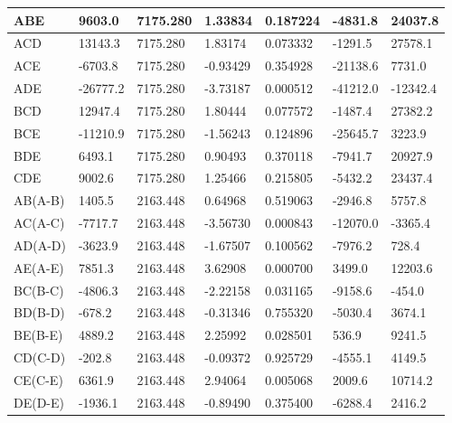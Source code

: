 \documentclass[materials,article,submit,pdftex,moreauthors]{Definitions/mdpi}
\begin{document}
\begin{ThreePartTable}
\begin{footnotesize}
\begin{longtable}{|l|l|l|l|l|l|l|}
        ABE & 9603.0 & 7175.280 & 1.33834 & 0.187224 & -4831.8 & 24037.8 \\ \hline
        ACD & 13143.3 & 7175.280 & 1.83174 & 0.073332 & -1291.5 & 27578.1 \\ \hline
        ACE & -6703.8 & 7175.280 & -0.93429 & 0.354928 & -21138.6 & 7731.0 \\ \hline
        \rowcolor{LightCyan}
        ADE & -26777.2 & 7175.280 & -3.73187 & 0.000512 & -41212.0 & -12342.4 \\ \hline
        BCD & 12947.4 & 7175.280 & 1.80444 & 0.077572 & -1487.4 & 27382.2 \\ \hline
        BCE & -11210.9 & 7175.280 & -1.56243 & 0.124896 & -25645.7 & 3223.9 \\ \hline
        BDE & 6493.1 & 7175.280 & 0.90493 & 0.370118 & -7941.7 & 20927.9 \\ \hline
        CDE & 9002.6 & 7175.280 & 1.25466 & 0.215805 & -5432.2 & 23437.4 \\ \hline
        AB(A-B) & 1405.5 & 2163.448 & 0.64968 & 0.519063 & -2946.8 & 5757.8 \\ \hline
        \rowcolor{LightCyan}
        AC(A-C) & -7717.7 & 2163.448 & -3.56730 & 0.000843 & -12070.0 & -3365.4 \\ \hline
        AD(A-D) & -3623.9 & 2163.448 & -1.67507 & 0.100562 & -7976.2 & 728.4 \\ \hline
        \rowcolor{LightCyan}
        AE(A-E) & 7851.3 & 2163.448 & 3.62908 & 0.000700 & 3499.0 & 12203.6 \\ \hline
        \rowcolor{LightCyan}
        BC(B-C) & -4806.3 & 2163.448 & -2.22158 & 0.031165 & -9158.6 & -454.0 \\ \hline
        BD(B-D) & -678.2 & 2163.448 & -0.31346 & 0.755320 & -5030.4 & 3674.1 \\ \hline
        \rowcolor{LightCyan}
        BE(B-E) & 4889.2 & 2163.448 & 2.25992 & 0.028501 & 536.9 & 9241.5 \\ \hline
        CD(C-D) & -202.8 & 2163.448 & -0.09372 & 0.925729 & -4555.1 & 4149.5 \\ \hline
        \rowcolor{LightCyan}
        CE(C-E) & 6361.9 & 2163.448 & 2.94064 & 0.005068 & 2009.6 & 10714.2 \\ \hline
        DE(D-E) & -1936.1 & 2163.448 & -0.89490 & 0.375400 & -6288.4 & 2416.2 \\ \hline
\end{longtable}
\end{footnotesize}
\end{ThreePartTable}
\end{document}
